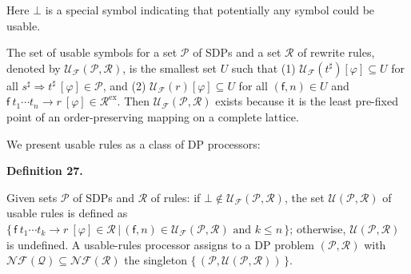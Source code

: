  
  
Here $\bot$ is a special symbol indicating that potentially any symbol could be usable.\par
 
 
 
The set of usable symbols for a set $\mathcal{P}$ of SDPs and a set $\mathcal{R}$ of rewrite rules, denoted by $\mathcal{U}_{\mathcal{F}}(\mathcal{P},\mathcal{R})$, is the smallest set $U$ such that (1) $\mathcal{U}_{\mathcal{F}}(t^{\sharp})[\varphi]\subseteq U$ for all ${s^{\sharp}}\Rightarrow{t^{\sharp}}\ [\varphi]\in\mathcal{P}$, and (2) $\mathcal{U}_{\mathcal{F}}(r)[\varphi]\subseteq U$ for all $(\mathsf{f},n)\in U$ and ${{\mathsf{f}}\ {{t}_{1}\cdots{t}_{n}}}\rightarrow{r}\ [\varphi]\in\mathcal{R}^{\mathrm{ex}}$. Then $\mathcal{U}_{\mathcal{F}}(\mathcal{P},\mathcal{R})$ exists because it is the least pre-fixed point of an order-preserving mapping on a complete lattice.\par
 
 
 
 
We present usable rules as a class of DP processors:\par
 
 
 
\par\medskip\noindent\textbf{Definition 27.}\par
 
 
Given sets $\mathcal{P}$ of SDPs and $\mathcal{R}$ of rules: if $\bot\notin\mathcal{U}_{\mathcal{F}}(\mathcal{P},\mathcal{R})$, the set $\mathcal{U}(\mathcal{P},\mathcal{R})$ of usable rules is defined as $\{\,{{\mathsf{f}}\ {{t}_{1}\cdots{t}_{k}}}\rightarrow{r}\ [\varphi]\in\mathcal{R}\,|\,(\mathsf{f},n)\in\mathcal{U}_{\mathcal{F}}(\mathcal{P},\mathcal{R})\text{ and }k\leq n\,\}$; otherwise, $\mathcal{U}(\mathcal{P},\mathcal{R})$ is undefined. A usable-rules processor assigns to a DP problem $(\mathcal{P},\mathcal{R})$ with $\mathcal{N}\!\mathcal{F}(\mathcal{Q})\subseteq\mathcal{N}\!\mathcal{F}(\mathcal{R})$ the singleton $\{\,(\mathcal{P},\mathcal{U}(\mathcal{P},\mathcal{R}))\,\}$.\par
 
 
